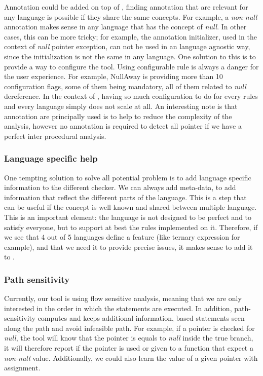 Annotation could be added on top of \slang{}, finding annotation that are relevant for any language is possible if they share the same concepts. 
For example, a \emph{non-null} annotation makes sense in any language that has the concept of \emph{null}. 
In other cases, this can be more tricky; for example, the annotation initializer, used in the context of \emph{null} pointer exception, can not be used in an language agnostic way, since the initialization is not the same in any language.\newline
One solution to this is to provide a way to configure the tool. 
Using configurable rule is always a danger for the user experience. For example, NullAway is providing more than 10 configuration flags, some of them being mandatory, all of them related to \emph{null} dereference. 
In the context of \slang{}, having so much configuration to do for every rules and every language simply does not scale at all.\newline
An interesting note is that annotation are principally used is to help to reduce the complexity of the analysis, however no annotation is required to detect all pointer if we have a perfect inter procedural analysis.


\subsubsection{Language specific help}
\label{subsubsec:language_specific_help}

One tempting solution to solve all potential problem is to add language specific information to the different checker.
We can always add meta-data, to add information that reflect the different parts of the language. 
This is a step that can be useful if the concept is well known and shared between multiple language. 
This is an important element: the language is not designed to be perfect and to satisfy everyone, but to support at best the rules implemented on it. 
Therefore, if we see that 4 out of 5 languages define a feature (like ternary expression for example), and that we need it to provide precise issues, it makes sense to add it to \slang{}.


\subsubsection{Path sensitivity}
\label{subsubsec:path_sensitivity}

Currently, our tool is using flow sensitive analysis, meaning that we are only interested in the order in which the statements are executed.
In addition, path-sensitivity computes and keeps additional information, based statements seen along the path and avoid infeasible path. 
For example, if a pointer is checked for \emph{null}, the tool will know that the pointer is equals to \emph{null} inside the true branch, it will therefore report if the pointer is used or given to a function that expect a \emph{non-null} value.
Additionally, we could also learn the value of a given pointer with assignment.


